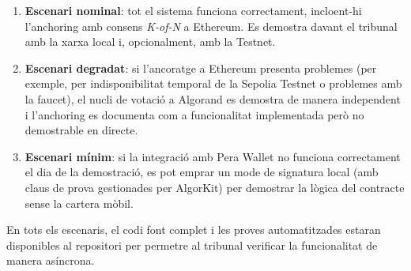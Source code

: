 \begin{enumerate}[label=\roman*.]
    \item \textbf{Escenari nominal}: tot el sistema funciona correctament, incloent-hi l'anchoring amb consens \textit{K-of-N} a Ethereum. Es demostra davant el tribunal amb la xarxa local i, opcionalment, amb la Testnet.
 
    \item \textbf{Escenari degradat}: si l'ancoratge a Ethereum presenta problemes (per exemple, per indisponibilitat temporal de la Sepolia Testnet o problemes amb la faucet), el nucli de votació a Algorand es demostra de manera independent i l'anchoring es documenta com a funcionalitat implementada però no demostrable en directe.
 
    \item \textbf{Escenari mínim}: si la integració amb Pera Wallet no funciona correctament el dia de la demostració, es pot emprar un mode de signatura local (amb claus de prova gestionades per AlgorKit) per demostrar la lògica del contracte sense la cartera mòbil.
\end{enumerate}
 
En tots els escenaris, el codi font complet i les proves automatitzades estaran disponibles al repositori per permetre al tribunal verificar la funcionalitat de manera asíncrona.